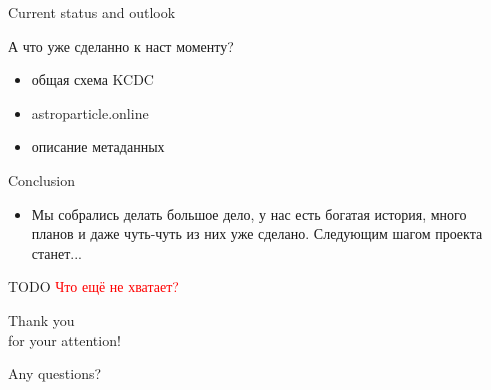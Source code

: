 \documentclass[18pt]{beamer}
\begin{document}
\begin{frame}{Current status and outlook}
\begin{block}{А что уже сделанно к наст моменту?}
  \begin{itemize}
    \item общая схема KCDC
    \item astroparticle.online
    \item описание метаданных
  \end{itemize}
\end{block}
\begin{block}{Conclusion}
  \begin{itemize}
    \item Мы собрались делать большое дело, у нас есть богатая история, много планов и даже чуть-чуть из них уже сделано. Следующим шагом проекта станет...
  \end{itemize}
\end{block}
\end{frame}

\begin{frame}{TODO}
\textcolor{red}{Что ещё не хватает?}
\end{frame}

\begin{frame}{}
\Huge
\begin{center}
\textcolor{kit-green100}{Thank you\\for your attention!}

\vspace{1em}
\Large
Any questions?
\end{center}
\end{frame}

%
%
\end{document}

